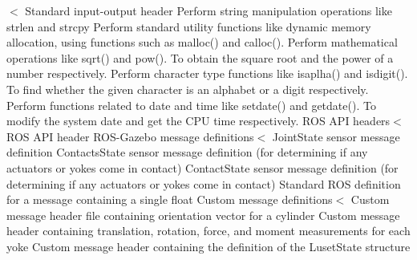 $<$ Standard input-\/output header Perform string manipulation operations like strlen and strcpy Perform standard utility functions like dynamic memory allocation, using functions such as malloc() and calloc(). Perform mathematical operations like sqrt() and pow(). To obtain the square root and the power of a number respectively. Perform character type functions like isaplha() and isdigit(). To find whether the given character is an alphabet or a digit respectively. Perform functions related to date and time like setdate() and getdate(). To modify the system date and get the C\+PU time respectively. R\+OS A\+PI headers$<$ R\+OS A\+PI header R\+O\+S-\/\+Gazebo message definitions$<$ Joint\+State sensor message definition Contacts\+State sensor message definition (for determining if any actuators or yokes come in contact) Contact\+State sensor message definition (for determining if any actuators or yokes come in contact) Standard R\+OS definition for a message containing a single float Custom message definitions$<$ Custom message header file containing orientation vector for a cylinder Custom message header containing translation, rotation, force, and moment measurements for each yoke Custom message header containing the definition of the Luset\+State structure 